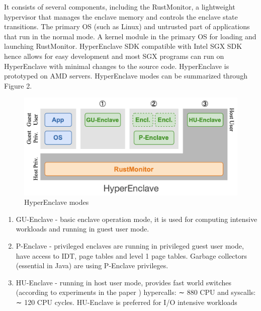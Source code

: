 It consists of several components, including the RustMonitor, a lightweight hypervisor that manages the enclave memory and controls the enclave state transitions. The primary OS (such as Linux) and untrusted part of applications that run in the normal mode.  A kernel module in the primary OS for loading and launching RustMonitor. HyperEnclave SDK compatible with  Intel SGX SDK hence allows for easy development and most SGX programs can run on HyperEnclave with minimal changes to the source code. HyperEnclave is prototyped on AMD servers.
HyperEnclave modes can be summarized through Figure 2. 

\begin{figure}[H]
    \centerline{\includegraphics[scale=.15]{figures/hyperenclave_modes.png}}
    \caption{HyperEnclave modes}
    \label{fig}
\end{figure}


\begin{enumerate}[topsep=0pt, partopsep=0pt]
    \setlength\itemsep{-0.4em}
    \item GU-Enclave - basic enclave operation mode, it is used for computing intensive workloads and running in guest user mode. 
    \item P-Enclave -  privileged enclaves are running in privileged guest user mode, have access to IDT, page tables and level 1 page tables. Garbage collectors (essential in Java)  are using P-Enclave privileges. 
    \item HU-Enclave  -  running in host user mode,  provides fast world switches (according to experiments in the paper ) hypercalls: ∼ 880 CPU and syscalls: ∼ 120 CPU cycles. HU-Enclave is preferred for I/O intensive workloads
\end{enumerate}




